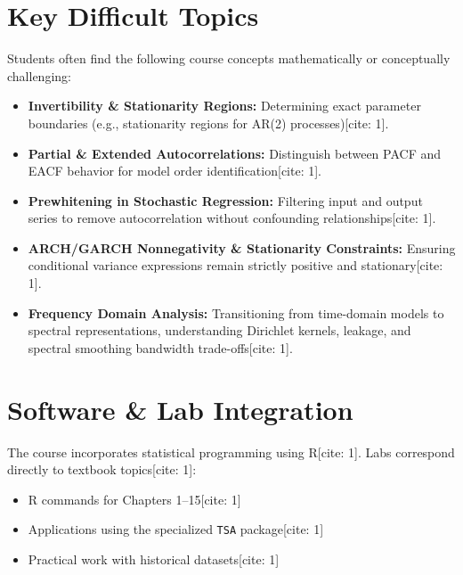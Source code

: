 \documentclass{article}
\begin{document}
\section{Key Difficult Topics}
Students often find the following course concepts mathematically or conceptually challenging:
\begin{itemize}
    \item \textbf{Invertibility \& Stationarity Regions:} Determining exact parameter boundaries (e.g., stationarity regions for AR(2) processes)[cite: 1].
    \item \textbf{Partial \& Extended Autocorrelations:} Distinguish between PACF and EACF behavior for model order identification[cite: 1].
    \item \textbf{Prewhitening in Stochastic Regression:} Filtering input and output series to remove autocorrelation without confounding relationships[cite: 1].
    \item \textbf{ARCH/GARCH Nonnegativity \& Stationarity Constraints:} Ensuring conditional variance expressions remain strictly positive and stationary[cite: 1].
    \item \textbf{Frequency Domain Analysis:} Transitioning from time-domain models to spectral representations, understanding Dirichlet kernels, leakage, and spectral smoothing bandwidth trade-offs[cite: 1].
\end{itemize}

\section{Software \& Lab Integration}
The course incorporates statistical programming using R[cite: 1]. Labs correspond directly to textbook topics[cite: 1]:
\begin{itemize}
    \item R commands for Chapters 1--15[cite: 1]
    \item Applications using the specialized \texttt{TSA} package[cite: 1]
    \item Practical work with historical datasets[cite: 1]
\end{itemize}
\end{document}
